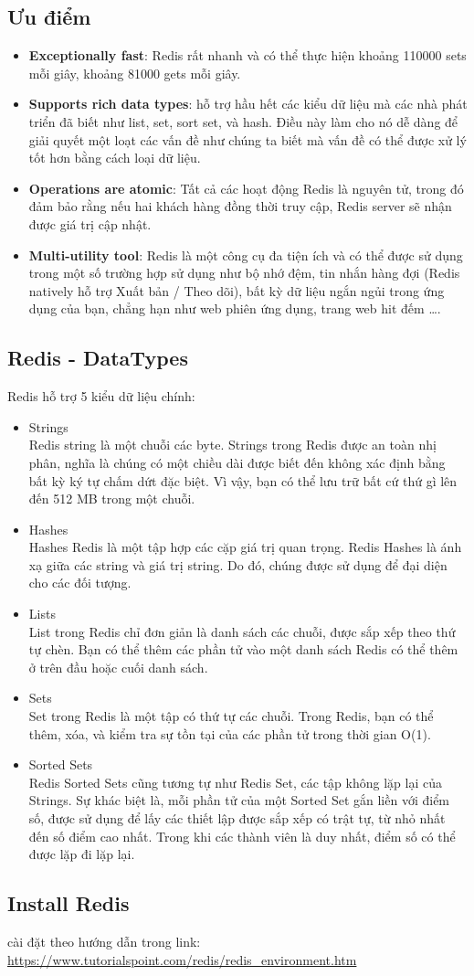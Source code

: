 \documentclass[a4paper,12pt]{report}
\begin{document}
\subsection*{Ưu điểm}
\begin{itemize}
\item \textbf{Exceptionally fast}: Redis rất nhanh và có thể thực hiện khoảng 110000 sets mỗi giây, khoảng 81000 gets mỗi giây.
\item \textbf{Supports rich data types}: hỗ trợ hầu hết các kiểu dữ liệu mà các nhà phát triển đã biết như list, set, sort set, và hash. Điều này làm cho nó dễ dàng để giải quyết một loạt các vấn đề như chúng ta biết mà vấn đề có thể được xử lý tốt hơn bằng cách loại dữ liệu.
\item \textbf{Operations are atomic}: Tất cả các hoạt động Redis là nguyên tử, trong đó đảm bảo rằng nếu hai khách hàng đồng thời truy cập, Redis server sẽ nhận được giá trị cập nhật.
\item \textbf{Multi-utility tool}:  Redis là một công cụ đa tiện ích và có thể được sử dụng trong một số trường hợp sử dụng như bộ nhớ đệm, tin nhắn hàng đợi (Redis natively hỗ trợ Xuất bản / Theo dõi), bất kỳ dữ liệu ngắn ngủi trong ứng dụng của bạn, chẳng hạn như web phiên ứng dụng, trang web hit đếm \ldots .
\end{itemize}
\subsection*{Redis - DataTypes}
Redis hỗ trợ 5 kiểu dữ liệu chính:
\begin{itemize}
\item Strings \\
Redis string là một chuỗi các byte. Strings trong Redis được an toàn nhị phân, nghĩa là chúng có một chiều dài được biết đến không xác định bằng bất kỳ ký tự chấm dứt đặc biệt. Vì vậy, bạn có thể lưu trữ bất cứ thứ gì lên đến 512 MB trong một chuỗi.
\item Hashes \\
Hashes Redis là một tập hợp các cặp giá trị quan trọng. Redis Hashes là ánh xạ giữa các string và giá trị string. Do đó, chúng được sử dụng để đại diện cho các đối tượng.
\item Lists \\
List trong Redis chỉ đơn giản là danh sách các chuỗi, được sắp xếp theo thứ tự chèn. Bạn có thể thêm các phần tử vào một danh sách Redis có thể thêm ở trên đầu hoặc cuối danh sách.
\item Sets \\
Set trong Redis là một tập có thứ tự các chuỗi. Trong Redis, bạn có thể thêm, xóa, và kiểm tra sự tồn tại của các phần tử trong thời gian O(1).
\item Sorted Sets \\
Redis Sorted Sets cũng tương tự như Redis Set, các tập không lặp lại của Strings. Sự khác biệt là, mỗi phần tử của một Sorted Set gắn liền với điểm số, được sử dụng để lấy các thiết lập được sắp xếp có trật tự, từ nhỏ nhất đến số điểm cao nhất. Trong khi các thành viên là duy nhất, điểm số có thể được lặp đi lặp lại.
\end{itemize}
\subsection*{Install Redis}
cài đặt theo hướng dẫn trong link: \url{https://www.tutorialspoint.com/redis/redis_environment.htm}
\end{document}
